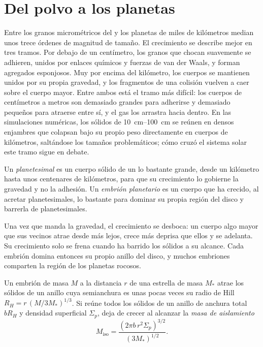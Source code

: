 \section{Del polvo a los planetas}

Entre los granos micrométricos del  y los planetas de miles
de kilómetros median unos trece órdenes de magnitud de tamaño. El crecimiento se
describe mejor en tres tramos. Por debajo de un centímetro, los granos que chocan
suavemente se adhieren, unidos por enlaces químicos y fuerzas de van der Waals, y forman
agregados esponjosos. Muy por encima del kilómetro, los cuerpos se mantienen unidos por su propia gravedad,
y los fragmentos de una colisión vuelven a caer sobre el cuerpo mayor. Entre ambos
está el tramo más difícil: los cuerpos de centímetros a metros son demasiado grandes para adherirse
y demasiado pequeños para atraerse entre sí, y el gas los arrastra hacia dentro. En
las simulaciones numéricas, los sólidos de \qtyrange{10}{100}{cm} se reúnen en densos
enjambres que colapsan bajo su propio peso directamente en cuerpos de kilómetros,
saltándose los tamaños problemáticos; cómo cruzó el sistema solar este tramo
sigue en debate.

\begin{definition}
\label{def:b2:planet-formation-meteorites:planetesimal}
Un \emph{planetesimal} es un cuerpo sólido de un  lo bastante grande, desde un kilómetro hasta unos centenares de kilómetros,
para que su crecimiento lo gobierne la gravedad y no la adhesión. Un
\emph{embrión planetario} es un cuerpo que ha crecido, al
acretar planetesimales, lo bastante para dominar su propia región del disco y
barrerla de planetesimales.
\end{definition}

Una vez que manda la gravedad, el crecimiento se desboca: un cuerpo algo mayor que sus
vecinos atrae  desde más lejos, crece más deprisa
que ellos y se adelanta. Su crecimiento solo se frena cuando ha barrido los
sólidos a su alcance. Cada embrión domina entonces su propio anillo del disco,
y muchos embriones comparten la región de los planetas rocosos.

\begin{proposition}\label{prop:b2:planet-formation-meteorites:isolation}
Un embrión de masa $M$ a la distancia $r$ de una estrella de masa $M_*$ atrae los
sólidos de un anillo cuya semianchura es unas pocas veces su radio de Hill
$R_H = r\,(M/3M_*)^{1/3}$. Si reúne todos los sólidos de un anillo de anchura
total $bR_H$ y densidad superficial $\Sigma_p$, deja de crecer al alcanzar la
\emph{masa de aislamiento}
\[
  M_{\mathrm{iso}} = \frac{(2\pi b\, r^2 \Sigma_p)^{3/2}}{(3M_*)^{1/2}} .
\]
\end{proposition}

